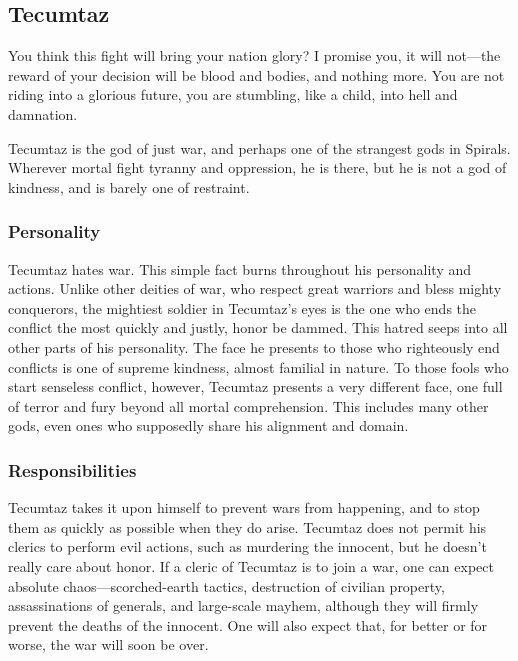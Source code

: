 \subsection*{Tecumtaz}
\begin{goddesc}
\end{goddesc}
\begin{itquote}
You think this fight will bring your nation glory?
I promise you, it will not---the reward of your decision will be blood and bodies, and nothing more.
You are not riding into a glorious future, you are stumbling, like a child, into hell and damnation.
\end{itquote}
Tecumtaz is the god of just war, and perhaps one of the strangest gods in Spirals.
Wherever mortal fight tyranny and oppression, he is there, but he is not a god of kindness, and is barely one of restraint.

\subsubsection*{Personality}
Tecumtaz hates war.
This simple fact burns throughout his personality and actions.
Unlike other deities of war, who respect great warriors and bless mighty conquerors, the mightiest soldier in Tecumtaz's eyes is the one who ends the conflict the most quickly and justly, honor be dammed.
This hatred seeps into all other parts of his personality.
The face he presents to those who righteously end conflicts is one of supreme kindness, almost familial in nature.
To those fools who start senseless conflict, however, Tecumtaz presents a very different face, one full of terror and fury beyond all mortal comprehension.
This includes many other gods, even ones who supposedly share his alignment and domain.

\subsubsection*{Responsibilities}
Tecumtaz takes it upon himself to prevent wars from happening, and to stop them as quickly as possible when they do arise.
Tecumtaz does not permit his clerics to perform evil actions, such as murdering the innocent, but he doesn't really care about honor.
If a cleric of Tecumtaz is to join a war, one can expect absolute chaos---scorched-earth tactics, destruction of civilian property, assassinations of generals, and large-scale mayhem, although they will firmly prevent the deaths of the innocent.
One will also expect that, for better or for worse, the war will soon be over.


